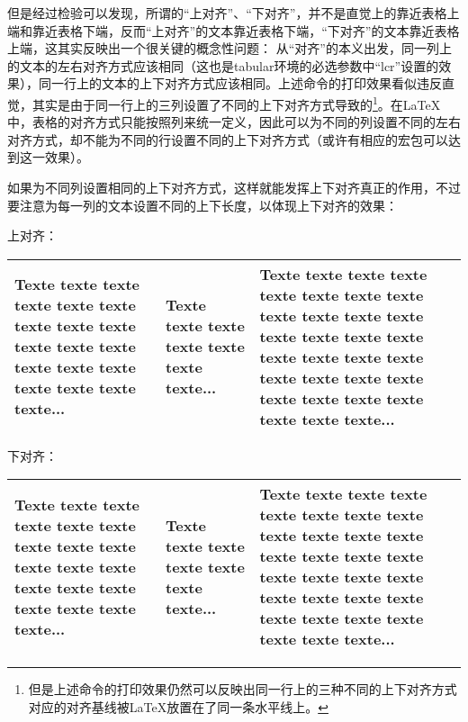 ﻿\documentclass{article}
\begin{document}
    但是经过检验可以发现，所谓的``上对齐''、``下对齐''，并不是直觉上的靠近表格上端和靠近表格下端，反而``上对齐''的文本靠近表格下端，``下对齐''的文本靠近表格上端，这其实反映出一个很关键的概念性问题：
    从``对齐''的本义出发，同一列上的文本的左右对齐方式应该相同（这也是tabular环境的必选参数中``lcr''设置的效果），同一行上的文本的上下对齐方式应该相同。上述命令的打印效果看似违反直觉，其实是由于同一行上的三列设置了不同的上下对齐方式导致的\footnote{但是上述命令的打印效果仍然可以反映出同一行上的三种不同的上下对齐方式对应的对齐基线被\LaTeX 放置在了同一条水平线上。}。在\LaTeX 中，表格的对齐方式只能按照列来统一定义，因此可以为不同的列设置不同的左右对齐方式，却不能为不同的行设置不同的上下对齐方式（或许有相应的宏包可以达到这一效果）。

    如果为不同列设置相同的上下对齐方式，这样就能发挥上下对齐真正的作用，不过要注意为每一列的文本设置不同的上下长度，以体现上下对齐的效果：

    上对齐：

    \mbox{}

    \begin{tabular}{p{8em}p{8em}p{8em}}
        \hline
        Texte texte texte texte texte texte texte
        texte texte texte texte texte texte
        texte texte texte texte texte texte...&
        Texte texte texte texte texte texte texte...&
        Texte texte texte texte texte texte texte
        texte texte texte texte texte texte
        texte texte texte texte texte texte
        texte texte texte texte texte texte
        texte texte texte texte texte texte...\\
        \hline
    \end{tabular}

    \mbox{}

    下对齐：

    \mbox{}

    \begin{tabular}{b{8em}b{8em}b{8em}}
        \hline
        Texte texte texte texte texte texte texte
        texte texte texte texte texte texte
        texte texte texte texte texte texte...&
        Texte texte texte texte texte texte texte...&
        Texte texte texte texte texte texte texte
        texte texte texte texte texte texte
        texte texte texte texte texte texte
        texte texte texte texte texte texte
        texte texte texte texte texte texte...\\
        \hline
    \end{tabular}
\end{document}
